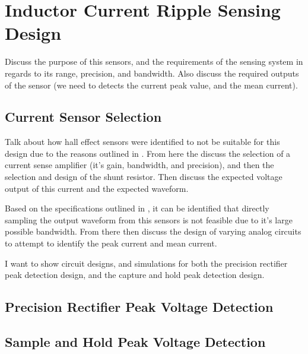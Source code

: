 \section{Inductor Current Ripple Sensing Design}

Discuss the purpose of this sensors, and the requirements of the sensing system in regards to its range, precision, and bandwidth. Also discuss the required outputs of the sensor (we need to detects the current peak value, and the mean current).


\subsection{Current Sensor Selection}

Talk about how hall effect sensors were identified to not be suitable for this design due to the reasons outlined in . From here the discuss the selection of a current sense amplifier (it's gain, bandwidth, and precision), and then the selection and design of the shunt resistor. Then discuss the expected voltage output of this current and the expected waveform. 


Based on the specifications outlined in , it can be identified that directly sampling the output waveform from this sensors is not feasible due to it's large possible bandwidth. From there then discuss the design of varying analog circuits to attempt to identify the peak current and mean current. 

I want to show circuit designs, and simulations for both the precision rectifier peak detection design, and the capture and hold peak detection design. 

\subsection{Precision Rectifier Peak Voltage Detection}

\subsection{Sample and Hold Peak Voltage Detection}




